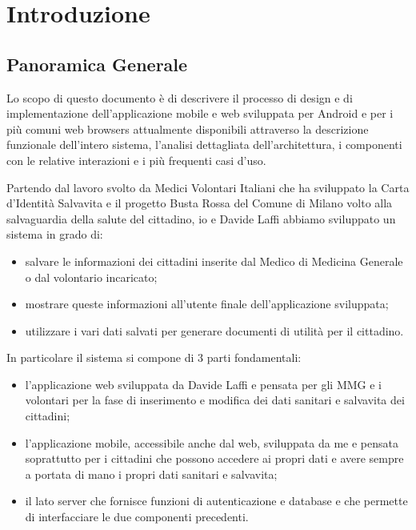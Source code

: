 \documentclass[12pt,a4paper,twoside,openright,titlepage]{book}
\begin{document}
\chapter*{Introduzione}
%
\label{cap:introduzione}
\section{Panoramica Generale}
Lo scopo di questo documento è di descrivere il processo di design e di implementazione dell'applicazione mobile e web sviluppata per Android e per i più comuni web browsers attualmente disponibili attraverso la descrizione funzionale dell'intero sistema, l'analisi dettagliata dell'architettura, i componenti con le relative interazioni e i più frequenti casi d'uso.\newline

Partendo dal lavoro svolto da Medici Volontari Italiani che ha sviluppato la Carta d'Identità Salvavita e il progetto Busta Rossa del Comune di Milano volto alla salvaguardia della salute del cittadino, io e Davide Laffi abbiamo sviluppato un sistema in grado di:
\begin{itemize}
\item salvare le informazioni dei cittadini inserite dal Medico di Medicina Generale o dal volontario incaricato;
\item mostrare queste informazioni all'utente finale dell'applicazione sviluppata;
\item utilizzare i vari dati salvati per generare documenti di utilità per il cittadino.
\end{itemize}
In particolare il sistema si compone di 3 parti fondamentali:
\begin{itemize}
\item l'applicazione web sviluppata da Davide Laffi e pensata per gli MMG e i volontari per la fase di inserimento e modifica dei dati sanitari e salvavita dei cittadini;
\item l'applicazione mobile, accessibile anche dal web, sviluppata da me e pensata soprattutto per i cittadini che possono accedere ai propri dati e avere sempre a portata di mano i propri dati sanitari e salvavita;
\item il lato server che fornisce funzioni di autenticazione e database e che permette di interfacciare le due componenti precedenti.
\end{itemize}
\end{document}

